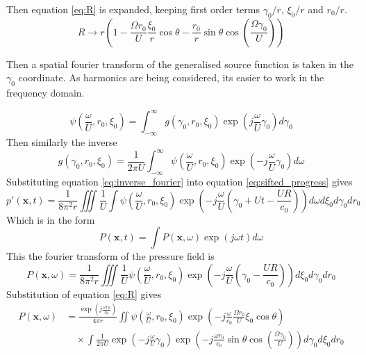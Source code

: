\documentclass[8pt]{article}
\begin{document}
Then equation \ref{eq:R} is expanded, keeping first order terms $\gamma_0/r$, $\xi_0/r$ and $r_0/r$.
\begin{equation}
    R \rightarrow  r \left( 1 - \frac{\Omega r_0 }{U} \frac{\xi_0}{r}\cos\theta - \frac{r_0}{r} \sin \theta \cos\left(\frac{\Omega \gamma_0}{U}\right) \right)
\end{equation}

Then a spatial fourier transform of the generalised source function is taken in the $\gamma_0$ coordinate.
As harmonics are being considered, its easier to work in the frequency domain.

\begin{equation}
    \psi \left(\frac{\omega}{U}, r_0, \xi_0\right) = \int_{-\infty}^\infty g(\gamma_0, r_0, \xi_0) \exp \left(j \frac{\omega}{U} \gamma_0 \right) d\gamma_0
    \label{eq:fourier}
\end{equation}
Then similarly the inverse
\begin{equation}
    g(\gamma_0, r_0, \xi_0) = \frac{1}{2\pi U} \int_{-\infty}^\infty \psi\left(\frac{\omega}{U}, r_0, \xi_0\right) \exp \left(-j \frac{\omega}{U} \gamma_0 \right) d\omega
    \label{eq:inverse_fourier}
\end{equation}
Substituting equation \ref{eq:inverse_fourier} into equation \ref{eq:sifted_progress} gives
\begin{equation}
p'(\mathbf{x},t) = \frac{1}{8\pi^2 r} \iiint \frac{1}{U} \int \psi\left(\frac{\omega}{U}, r_0, \xi_0\right) \exp\left(-j \frac{\omega}{U} \left( \gamma_0 + Ut - \frac{UR}{c_0} \right) \right) d\omega d\xi_0 d\gamma_0 dr_0
\end{equation}
Which is in the form
\begin{equation}
    P(\mathbf{x},t) = \int P(\mathbf{x}, \omega) \exp(j\omega t) d\omega
\end{equation}
This the fourier transform of the pressure field is
\begin{equation}
    P(\mathbf{x}, \omega) = \frac{1}{8\pi^2 r} \iiint \frac{1}{U} \psi\left(\frac{\omega}{U}, r_0, \xi_0\right) \exp\left(-j \frac{\omega}{U} \left( \gamma_0 - \frac{UR}{c_0} \right) \right) d\xi_0 d\gamma_0 dr_0
\end{equation}
Substitution of equation \ref{eq:R} gives
\begin{equation}
    \begin{aligned}
        P(\mathbf{x}, \omega) &= \frac{\exp\left(j \frac{\omega r_0}{c_0} \right)}{4\pi r} 
        \iint \psi\left(\frac{\omega}{U}, r_0, \xi_0\right) 
        \exp\left(-j \frac{\omega}{c_0} \frac{\Omega r_0}{U} \xi_0 \cos\theta\right) \\
        &\quad \times \int \frac{1}{2\pi U} \exp\left(-j \frac{\omega}{U}\gamma_0 \right) \exp\left(
            -j \frac{\omega r_0}{c_0} \sin \theta \cos\left(\frac{\Omega \gamma_0}{U} \right)\right) 
        d\gamma_0 d\xi_0 dr_0
    \end{aligned}
\end{equation}
\end{document}
